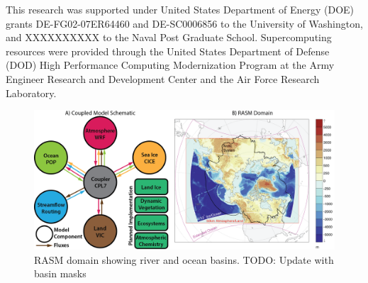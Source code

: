 \documentclass[jgrga, draft]{agutex}
\begin{document}
\begin{article}
\begin{itemize}
\end{itemize}

%
%
%


\begin{acknowledgments}
This research was supported under United States Department of Energy (DOE) grants DE-FG02-07ER64460 and DE-SC0006856 to the University of Washington, and XXXXXXXXXX to the Naval Post Graduate School.
Supercomputing resources were provided through the United States Department of Defense (DOD) High Performance Computing Modernization Program at the Army Engineer Research and Development Center and the Air Force Research Laboratory.
\end{acknowledgments}





%
%
\end{article}


%
%
%
%

\clearpage
\begin{figure}
\noindent\includegraphics[width=40pc,natwidth=1]{rasm_schematic_domain}
\caption{RASM domain showing river and ocean basins. TODO: Update with basin masks}
\label{fig:rasm_schematic_domain}
\end{figure}
\end{document}
